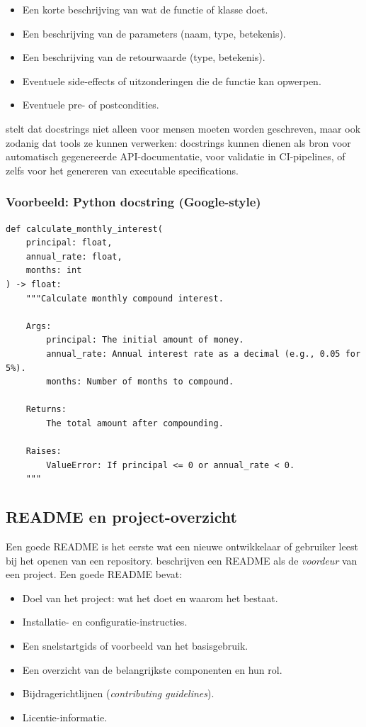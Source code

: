 \begin{itemize}
    \item Een korte beschrijving van wat de functie of klasse doet.
    \item Een beschrijving van de parameters (naam, type, betekenis).
    \item Een beschrijving van de retourwaarde (type, betekenis).
    \item Eventuele side-effects of uitzonderingen die de functie kan opwerpen.
    \item Eventuele pre- of postcondities.
\end{itemize}

\textcite{martraire2019livingdocumentation} stelt dat docstrings niet alleen voor mensen moeten worden geschreven, maar ook zodanig dat tools ze kunnen verwerken: docstrings kunnen dienen als bron voor automatisch gegenereerde API-documentatie, voor validatie in CI-pipelines, of zelfs voor het genereren van executable specifications.

\subsubsection{Voorbeeld: Python docstring (Google-style)}
\begin{verbatim}
def calculate_monthly_interest(
    principal: float,
    annual_rate: float,
    months: int
) -> float:
    """Calculate monthly compound interest.

    Args:
        principal: The initial amount of money.
        annual_rate: Annual interest rate as a decimal (e.g., 0.05 for 5%).
        months: Number of months to compound.

    Returns:
        The total amount after compounding.

    Raises:
        ValueError: If principal <= 0 or annual_rate < 0.
    """
\end{verbatim}

\subsection{README en project-overzicht}
Een goede README is het eerste wat een nieuwe ontwikkelaar of gebruiker leest bij het openen van een repository. \textcite{bhatti2021docsdevelopers} beschrijven een README als de \textit{voordeur} van een project. Een goede README bevat:

\begin{itemize}
    \item Doel van het project: wat het doet en waarom het bestaat.
    \item Installatie- en configuratie-instructies.
    \item Een snelstartgids of voorbeeld van het basisgebruik.
    \item Een overzicht van de belangrijkste componenten en hun rol.
    \item Bijdragerichtlijnen (\textit{contributing guidelines}).
    \item Licentie-informatie.
\end{itemize}

